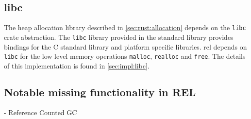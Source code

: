 \subsection{libc}

The heap allocation library described in \autoref{sec:rust:allocation} depends on the \texttt{libc} crate abstraction.
The \texttt{libc} library provided in the standard library provides bindings for the C standard library and platform specific libraries.
\gls{rel} depends on \texttt{libc} for the low level memory operations \texttt{malloc}, \texttt{realloc} and \texttt{free}.
The details of this implementation is found in \autoref{sec:impl:libc}. 

\subsection{Notable missing functionality in REL}

- Reference Counted GC
